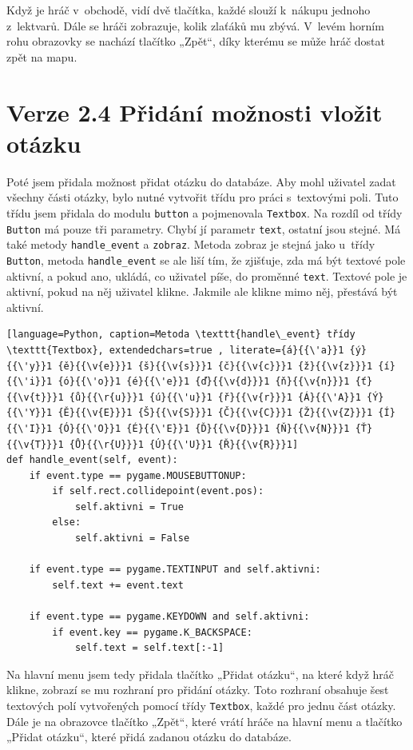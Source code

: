 \documentclass[12pt]{report}
\begin{document}
Když je hráč v~obchodě, vidí dvě tlačítka, každé slouží k~nákupu jednoho z~lektvarů. Dále se hráči zobrazuje, kolik zlaťáků mu zbývá. V~levém horním rohu obrazovky se nachází tlačítko „Zpět“, díky kterému se může hráč dostat zpět na mapu.

\section{Verze 2.4 Přidání možnosti vložit otázku}

Poté jsem přidala možnost přidat otázku do databáze. Aby mohl uživatel zadat všechny části otázky, bylo nutné vytvořit třídu pro práci s~textovými poli. Tuto třídu jsem přidala do modulu \texttt{button} a pojmenovala \texttt{Textbox}. Na rozdíl od třídy \texttt{Button} má pouze tři parametry. Chybí jí parametr \texttt{text}, ostatní jsou stejné. Má také metody \texttt{handle\_event} a \texttt{zobraz}. Metoda zobraz je stejná jako u~třídy \texttt{Button}, metoda \texttt{handle\_event} se ale liší tím, že zjišťuje, zda má být textové pole aktivní, a pokud ano, ukládá, co uživatel píše, do proměnné \texttt{text}. Textové pole je aktivní, pokud na něj uživatel klikne. Jakmile ale klikne mimo něj, přestává být aktivní.

\begin{lstlisting}[language=Python, caption=Metoda \texttt{handle\_event} třídy \texttt{Textbox}, extendedchars=true , literate={á}{{\'a}}1 {ý}{{\'y}}1 {ě}{{\v{e}}}1 {š}{{\v{s}}}1 {č}{{\v{c}}}1 {ž}{{\v{z}}}1 {í}{{\'i}}1 {ó}{{\'o}}1 {é}{{\'e}}1 {ď}{{\v{d}}}1 {ň}{{\v{n}}}1 {ť}{{\v{t}}}1 {ů}{{\r{u}}}1 {ú}{{\'u}}1 {ř}{{\v{r}}}1 {Á}{{\'A}}1 {Ý}{{\'Y}}1 {Ě}{{\v{E}}}1 {Š}{{\v{S}}}1 {Č}{{\v{C}}}1 {Ž}{{\v{Z}}}1 {Í}{{\'I}}1 {Ó}{{\'O}}1 {É}{{\'E}}1 {Ď}{{\v{D}}}1 {Ň}{{\v{N}}}1 {Ť}{{\v{T}}}1 {Ů}{{\r{U}}}1 {Ú}{{\'U}}1 {Ř}{{\v{R}}}1]
def handle_event(self, event):
    if event.type == pygame.MOUSEBUTTONUP:
        if self.rect.collidepoint(event.pos):
            self.aktivni = True
        else:
            self.aktivni = False

    if event.type == pygame.TEXTINPUT and self.aktivni:
        self.text += event.text

    if event.type == pygame.KEYDOWN and self.aktivni:
        if event.key == pygame.K_BACKSPACE:
            self.text = self.text[:-1]
\end{lstlisting}

  Na hlavní menu jsem tedy přidala tlačítko „Přidat otázku“, na které když hráč klikne, zobrazí se mu rozhraní pro přidání otázky. Toto rozhraní obsahuje šest textových polí vytvořených pomocí třídy \texttt{Textbox}, každé pro jednu část otázky. Dále je na obrazovce tlačítko „Zpět“, které vrátí hráče na hlavní menu a tlačítko „Přidat otázku“, které přidá zadanou otázku do databáze.
\end{document}
